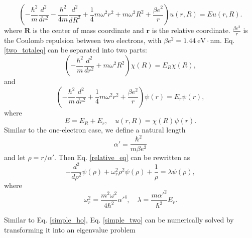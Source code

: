 \documentclass{article}
\begin{document}
\begin{equation}\label{two_totaleq}
\left(-\frac{\hbar^2}{m}\frac{d^2}{dr^2}-\frac{\hbar^2}{4m}\frac{d^2}{dR^2}+\frac{1}{4}m\omega^2r^2+m\omega^2R^2+\frac{\beta e^2}{r}\right)u(r,R)=Eu(r,R).
\end{equation}
where $\mathbf{R}$ is the center of mass coordinate and $\mathbf{r}$ is the relative coordinate. 
$\frac{\beta e^2}{r}$ is the Coulomb repulsion between two electrons, with $\beta e^2=1.44\ \mathrm{eV\cdot nm}$. 
Eq. \ref{two_totaleq} can be separated into two parts: 
\begin{equation}
\left(-\frac{\hbar^2}{m}\frac{d^2}{dr^2}+m\omega^2R^2\right)\chi(R)=E_R\chi(R), 
\end{equation}
and 
\begin{equation}\label{relative_eq}
\left(  -\frac{\hbar^2}{m} \frac{d^2}{dr^2}+ \frac{1}{4}m\omega^2 r^2+\frac{\beta e^2}{r}\right)\psi(r)  = E_r \psi(r), 
\end{equation}
where
\begin{equation}
E=E_R+E_r, \quad u(r,R)=\chi(R)\psi(r). 
\end{equation}
Similar to the one-electron case, we define a natural length 
\begin{equation*}
\alpha'=\frac{\hbar^2}{m\beta e^2}
\end{equation*}
and let $\rho=r/\alpha'$. Then Eq. \ref{relative_eq} can be rewritten as 
\begin{equation}\label{simple_two}
-\frac{d^2}{d\rho^2} \psi(\rho) + \omega_r^2\rho^2\psi(\rho) +\frac{1}{\rho} = \lambda \psi(\rho),
\end{equation}
where 
\begin{equation}
\omega_r^2=\frac{m^2\omega^2}{4\hbar^2}\alpha'^4,\quad \lambda=\frac{m\alpha'^2}{\hbar^2}E_r. 
\end{equation}
\par
Similar to Eq. \ref{simple_ho}, Eq. \ref{simple_two} can be numerically solved by transforming it into an eigenvalue problem 
\end{document}
